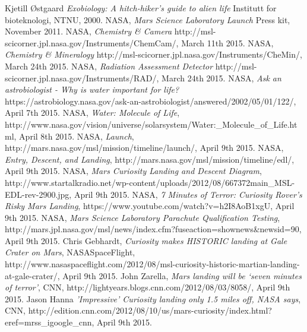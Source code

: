 \begin{thebibliography}{99}	%
		Kjetill Østgaard
		\emph{Exobiology: A hitch-hiker's guide to alien life}
		Institutt for bioteknologi,
		NTNU,
		2000.
		NASA,
		\emph{Mars Science Laboratory Launch}
		Press kit,
		November 2011.
		NASA,
		\emph{Chemistry \& Camera}
		http://msl-scicorner.jpl.nasa.gov/Instruments/ChemCam/,
		March 11th 2015.
		NASA,
		\emph{Chemistry \& Mineralogy}
		http://msl-scicorner.jpl.nasa.gov/Instruments/CheMin/,
		March 24th 2015.
		NASA,
		\emph{Radiation Assessment Detector}
		http://msl-scicorner.jpl.nasa.gov/Instruments/RAD/,
		March 24th 2015.
		NASA,
		\emph{Ask an astrobiologist - Why is water important for life?}
		https://astrobiology.nasa.gov/ask-an-astrobiologist/answered/2002/05/01/122/,
		April 7th 2015.
		NASA,
		\emph{Water: Molecule of Life},
		http://www.nasa.gov/vision/universe/solarsystem/Water:\_Molecule\_of\_Life.html,
		April 8th 2015.
		NASA,
		\emph{Launch},
		http://mars.nasa.gov/msl/mission/timeline/launch/,
		April 9th 2015.
		NASA,
		\emph{Entry, Descent, and Landing},
		http://mars.nasa.gov/msl/mission/timeline/edl/,
		April 9th 2015.
		NASA,
		\emph{Mars Curiosity Landing and Descent Diagram},
		http://www.startalkradio.net/wp-content/uploads/2012/08/667372main\_MSL-EDL-rev-2900.jpg,
		April 9th 2015.
		NASA,
		\emph{7 Minutes of Terror: Curiosity Rover's Risky Mars Landing},
		https://www.youtube.com/watch?v=h2I8AoB1xgU,
		April 9th 2015.
		NASA,
		\emph{Mars Science Laboratory Parachute Qualification Testing},
		http://mars.jpl.nasa.gov/msl/news/index.cfm?fuseaction=shownews\&newsid=90,
		April 9th 2015.
		Chris Gebhardt,
		\emph{Curiosity makes HISTORIC landing at Gale Crater on Mars},
		NASASpaceFlight,
		http://www.nasaspaceflight.com/2012/08/msl-curiosity-historic-martian-landing-at-gale-crater/,
		April 9th 2015.
		John Zarella,
		\emph{Mars landing will be ‘seven minutes of terror’},
		CNN,
		http://lightyears.blogs.cnn.com/2012/08/03/8058/,
		April 9th 2015.
		Jason Hanna
		\emph{'Impressive' Curiosity landing only 1.5 miles off, NASA says},
		CNN,
		http://edition.cnn.com/2012/08/10/us/mars-curiosity/index.html?eref=mrss\_igoogle\_cnn,
		April 9th 2015.

\end{thebibliography}
